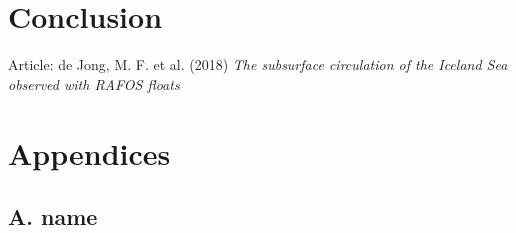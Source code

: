 \documentclass[11pt]{report}
\begin{document}
\chapter{Conclusion}\label{sec:conclusion}


\medskip

\begin{thebibliography}{9}
Article: de Jong, M. F. et al. (2018) 
\textit{The subsurface circulation of the Iceland Sea observed with RAFOS floats}

\end{thebibliography}

\chapter*{Appendices}

\section*{A. name}\label{Ap:A}
\setcounter{figure}{0}
\renewcommand{\thefigure}{A.\arabic{figure}}
\end{document}
